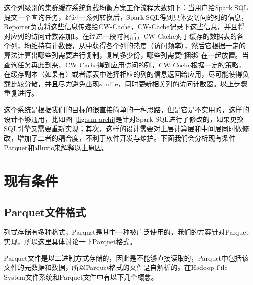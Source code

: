 \par 这个列级别的集群缓存系统负载均衡方案工作流程大致如下：当用户给Spark SQL提交一个查询任务，经过一系列转换后，Spark SQL得到具体要访问的列的信息，Reporter负责将这些信息传递给CW-Cache，CW-Cache记录下这些信息，并且将对应列的访问计数器加1。在经过一段时间后，CW-Cache对于缓存的数据表的各个列，均维持有计数器，从中获得各个列的热度（访问频率），然后它根据一定的算法计算出哪些列需要进行复制，复制多少份，哪些列需要“捆绑”在一起放置。当查询任务再此到来，CW-Cache得到应用访问的列，CW-Cache根据一定的策略，在缓存副本（如果有）或者原表中选择相应的列的信息返回给应用，尽可能使得负载比较分散，并且尽力避免出现shuffle，同时更新相关列的访问计数器。以上步骤重复进行。

\par 这个系统是根据我们的目标的很直接简单的一种思路，但是它是不实用的，这样的设计不够通用，比如图~\ref{fig:sim-archi}是针对Spark SQL进行了修改的，如果更换SQL引擎又需要重新实现；其次，这样的设计需要对上层计算层和中间层同时做修改，增加了二者的耦合度，不利于软件开发与维护。下面我们会分析现有条件Parquet和alluxio来解释以上原因。

\section{现有条件}

\subsection{Parquet文件格式}

\par 列式存储有多种格式，Parquet是其中一种被广泛使用的，我们的方案针对Parquet实现，所以这里具体讨论一下Parquet格式。

\par Parquet文件是以二进制方式存储的，因此是不能够直接读取的，Parquet中包括该文件的元数据和数据，所以Parquet格式的文件是自解析的。在Hadoop File System文件系统和Parquet文件中有以下几个概念。

